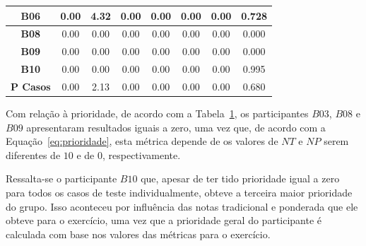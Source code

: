 \begin{table}[htbp]
\begin{tabular}{|c|ccccccc|}
		\textbf{B06} & \multicolumn{1}{c|}{0.00} & \multicolumn{1}{c|}{4.32} & \multicolumn{1}{c|}{0.00} & \multicolumn{1}{c|}{0.00} & \multicolumn{1}{c|}{0.00} & \multicolumn{1}{c|}{0.00} & 0.728 \\ \hline
		\rowcolor[HTML]{F2F2F2} 
		\textbf{B08} & \multicolumn{1}{c|}{\cellcolor[HTML]{F2F2F2}0.00} & \multicolumn{1}{c|}{\cellcolor[HTML]{F2F2F2}0.00} & \multicolumn{1}{c|}{\cellcolor[HTML]{F2F2F2}0.00} & \multicolumn{1}{c|}{\cellcolor[HTML]{F2F2F2}0.00} & \multicolumn{1}{c|}{\cellcolor[HTML]{F2F2F2}0.00} & \multicolumn{1}{c|}{\cellcolor[HTML]{F2F2F2}0.00} & 0.000 \\ \hline
		\textbf{B09} & \multicolumn{1}{c|}{0.00} & \multicolumn{1}{c|}{0.00} & \multicolumn{1}{c|}{0.00} & \multicolumn{1}{c|}{0.00} & \multicolumn{1}{c|}{0.00} & \multicolumn{1}{c|}{0.00} & 0.000 \\ \hline
		\rowcolor[HTML]{F2F2F2} 
		\textbf{B10} & \multicolumn{1}{c|}{\cellcolor[HTML]{F2F2F2}0.00} & \multicolumn{1}{c|}{\cellcolor[HTML]{F2F2F2}0.00} & \multicolumn{1}{c|}{\cellcolor[HTML]{F2F2F2}0.00} & \multicolumn{1}{c|}{\cellcolor[HTML]{F2F2F2}0.00} & \multicolumn{1}{c|}{\cellcolor[HTML]{F2F2F2}0.00} & \multicolumn{1}{c|}{\cellcolor[HTML]{F2F2F2}0.00} & 0.995 \\ \hline
		\rowcolor[HTML]{D0CECE} 
		\textbf{P Casos} & \multicolumn{1}{c|}{\cellcolor[HTML]{D0CECE}0.00} & \multicolumn{1}{c|}{\cellcolor[HTML]{D0CECE}2.13} & \multicolumn{1}{c|}{\cellcolor[HTML]{D0CECE}0.00} & \multicolumn{1}{c|}{\cellcolor[HTML]{D0CECE}0.00} & \multicolumn{1}{c|}{\cellcolor[HTML]{D0CECE}0.00} & \multicolumn{1}{c|}{\cellcolor[HTML]{D0CECE}0.00} & 0.680 \\ \hline
	\end{tabular}
	\label{tab:F3_A3_P}
\end{table}

Com relação à prioridade, de acordo com a Tabela~\ref{tab:F3_A3_P}, os participantes $B03$, $B08$ e $B09$ apresentaram resultados iguais a zero, uma vez que, de acordo com a Equação~\ref{eq:prioridade}, esta métrica depende de os valores de $NT$ e $NP$ serem diferentes de $10$ e de $0$, respectivamente. 

Ressalta-se o participante $B10$ que, apesar de ter tido prioridade igual a zero para todos os casos de teste individualmente, obteve a terceira maior prioridade do grupo. Isso aconteceu por influência das notas tradicional e ponderada que ele obteve para o exercício, uma vez que a prioridade geral do participante é calculada com base nos valores das métricas para o exercício.


